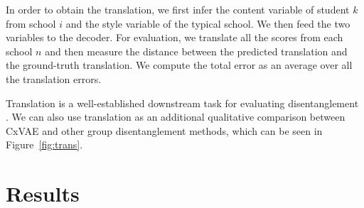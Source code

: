 \documentclass[../thesis.tex]{subfiles}
\begin{document}


In order to obtain the translation, we first infer the content variable of student $k$ from school $i$ and the style variable of the typical school. We then feed the two variables to the decoder. For evaluation, we translate all the scores from each school $n$ and then measure the distance between the predicted translation and the ground-truth translation. We compute the total error as an average over all the translation errors.

Translation is a well-established downstream task for evaluating disentanglement \citep{tenenbaum2000separating}. We can also use translation as an additional qualitative comparison between CxVAE and other group disentanglement methods, which can be seen in Figure~\ref{fig:trans}.


\section{Results}
\label{sec:results}
\end{document}
